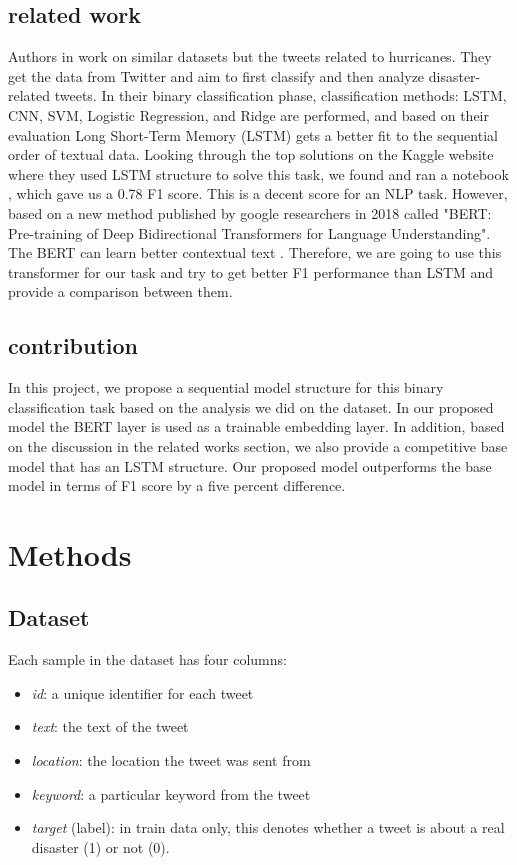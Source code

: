 \documentclass[sigconf]{acmart}
\begin{document}
\subsection{related work}
Authors in \cite{sit2019identifying} work on similar datasets but the tweets related to hurricanes. They get the data from Twitter and aim to first classify and then analyze disaster-related tweets. In their binary classification phase, classification methods: LSTM, CNN, SVM, Logistic Regression, and Ridge are performed, and based on their evaluation Long Short-Term Memory (LSTM) gets a better fit to the sequential order of textual data. Looking through the top solutions on the Kaggle website where they used LSTM structure to solve this task, we found and ran a notebook \cite{lstmsol}, which gave us a 0.78 F1 score. This is a decent score for an NLP task. However, based on a new method published by google researchers in 2018 called "BERT: Pre-training of Deep Bidirectional Transformers for Language Understanding". The BERT can learn better contextual text \cite{devlin2018bert}. Therefore, we are going to use this transformer for our task and try to get better F1 performance than LSTM and provide a comparison between them. 

\subsection{contribution}
In this project, we propose a sequential model structure for this binary classification task based on the analysis we did on the dataset. In our proposed model the BERT layer is used as a trainable embedding layer. In addition, based on the discussion in the related works section, we also provide a competitive base model that has an LSTM structure. Our proposed model outperforms the base model in terms of F1 score by a five percent difference. 




\section{Methods}

\subsection{Dataset}

Each sample in the dataset has four columns: 
\begin{itemize}
  \item \textit{id}: a unique identifier for each tweet 
  \item \textit{text}: the text of the tweet
  \item \textit{location}: the location the tweet was sent from
  \item \textit{keyword}: a particular keyword from the tweet
  \item \textit{target} (label): in train data only, this denotes whether a tweet is about a real disaster (1) or not (0). 
\end{itemize}
\end{document}
